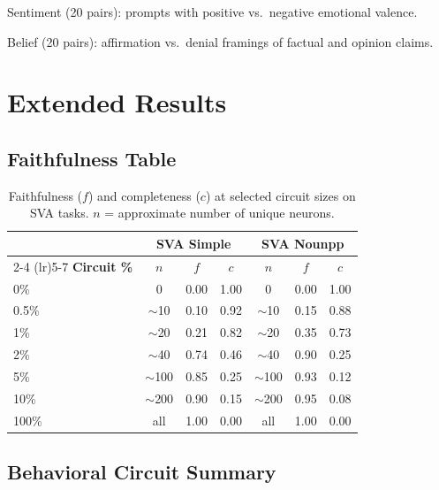 \documentclass[11pt]{article}
\begin{document}
Sentiment (20 pairs): prompts with positive vs.\ negative emotional valence.

Belief (20 pairs): affirmation vs.\ denial framings of factual and opinion claims.


\section{Extended Results}
\label{sec:extended_results}

\subsection{Faithfulness Table}

\begin{table}[h]
\centering
\caption{Faithfulness ($f$) and completeness ($c$) at selected circuit sizes on SVA tasks. $n$ = approximate number of unique neurons.}
\label{tab:faithfulness_full}
\small
\begin{tabular}{lcccccc}
\toprule
& \multicolumn{3}{c}{\textbf{SVA Simple}} & \multicolumn{3}{c}{\textbf{SVA Nounpp}} \\
\cmidrule(lr){2-4} \cmidrule(lr){5-7}
\textbf{Circuit \%} & $n$ & $f$ & $c$ & $n$ & $f$ & $c$ \\
\midrule
0\%    & 0         & 0.00 & 1.00 & 0         & 0.00 & 1.00 \\
0.5\%  & $\sim$10  & 0.10 & 0.92 & $\sim$10  & 0.15 & 0.88 \\
1\%    & $\sim$20  & 0.21 & 0.82 & $\sim$20  & 0.35 & 0.73 \\
2\%    & $\sim$40  & 0.74 & 0.46 & $\sim$40  & 0.90 & 0.25 \\
5\%    & $\sim$100 & 0.85 & 0.25 & $\sim$100 & 0.93 & 0.12 \\
10\%   & $\sim$200 & 0.90 & 0.15 & $\sim$200 & 0.95 & 0.08 \\
100\%  & all       & 1.00 & 0.00 & all       & 1.00 & 0.00 \\
\bottomrule
\end{tabular}
\end{table}


\subsection{Behavioral Circuit Summary}
\end{document}
